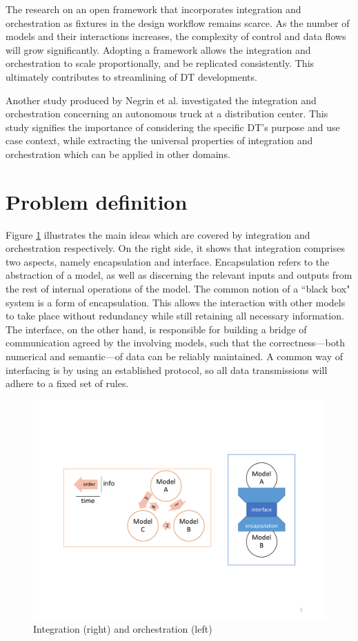 The research on an open framework that incorporates integration and orchestration as fixtures in the design workflow remains scarce. As the number of models and their interactions increases, the complexity of control and data flows will grow significantly. Adopting a framework allows the integration and orchestration to scale proportionally, and be replicated consistently. This ultimately contributes to streamlining of DT developments.

Another study produced by Negrin et al. \cite{Negrin2021} investigated the integration and orchestration concerning an autonomous truck at a distribution center. This study signifies the importance of considering the specific DT's purpose and use case context, while extracting the universal properties of integration and orchestration which can be applied in other domains.

\section{Problem definition}\label{sec:prodef}
Figure \ref{fig:intorc} illustrates the main ideas which are covered by integration and orchestration respectively. On the right side, it shows that integration comprises two aspects, namely encapsulation and interface. Encapsulation refers to the abstraction of a model, as well as discerning the relevant inputs and outputs from the rest of internal operations of the model. The common notion of a ``black box" system is a form of encapsulation. This allows the interaction with other models to take place without redundancy while still retaining all necessary information. The interface, on the other hand, is responsible for building a bridge of communication agreed by the involving models, such that the correctness---both numerical and semantic---of data can be reliably maintained. A common way of interfacing is by using an established protocol, so all data transmissions will adhere to a fixed set of rules. 

\begin{figure}[hbt!]
  \centering
  \includegraphics[scale=0.5]{figures/intorc.pdf}
  \caption{Integration (right) and orchestration (left)}
  \label{fig:intorc}
\end{figure}

